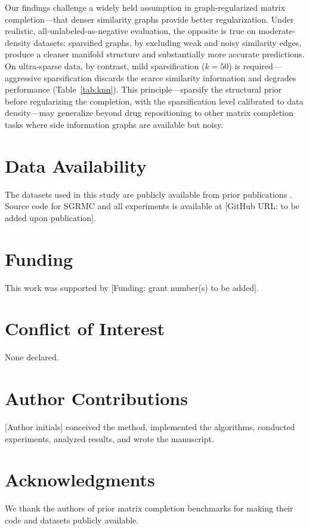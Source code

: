 \documentclass[webpdf,modern,large]{oup-authoring-template}
\begin{document}
Our findings challenge a widely held assumption in graph-regularized matrix completion---that denser similarity graphs provide better regularization. Under realistic, all-unlabeled-as-negative evaluation, the opposite is true on moderate-density datasets: sparsified graphs, by excluding weak and noisy similarity edges, produce a cleaner manifold structure and substantially more accurate predictions. On ultra-sparse data, by contrast, mild sparsification ($k=50$) is required---aggressive sparsification discards the scarce similarity information and degrades performance (Table~\ref{tab:knn}). This principle---sparsify the structural prior before regularizing the completion, with the sparsification level calibrated to data density---may generalize beyond drug repositioning to other matrix completion tasks where side information graphs are available but noisy.

\section*{Data Availability}

The datasets used in this study are publicly available from prior publications \cite{yang2019,luo2016}. Source code for SGRMC and all experiments is available at [GitHub URL: to be added upon publication].

\section*{Funding}

This work was supported by [Funding: grant number(s) to be added].

\section*{Conflict of Interest}

None declared.

\section*{Author Contributions}

[Author initials] conceived the method, implemented the algorithms, conducted experiments, analyzed results, and wrote the manuscript.

\section*{Acknowledgments}

We thank the authors of prior matrix completion benchmarks \cite{yang2019} for making their code and datasets publicly available.



\end{document}
